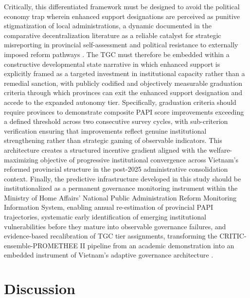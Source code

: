 \documentclass[12pt,a4paper]{article}
\begin{document}
Critically, this differentiated framework must be designed to avoid the political economy trap wherein enhanced support designations are perceived as punitive stigmatization of local administrations, a dynamic documented in the comparative decentralization literature as a reliable catalyst for strategic misreporting in provincial self-assessment and political resistance to externally imposed reform pathways \citep{Malesky2011, Malesky2010}. The TGC must therefore be embedded within a constructive developmental state narrative in which enhanced support is explicitly framed as a targeted investment in institutional capacity rather than a remedial sanction, with publicly codified and objectively measurable graduation criteria through which provinces can exit the enhanced support designation and accede to the expanded autonomy tier. Specifically, graduation criteria should require provinces to demonstrate composite PAPI score improvements exceeding a defined threshold across two consecutive survey cycles, with sub-criterion verification ensuring that improvements reflect genuine institutional strengthening rather than strategic gaming of observable indicators. This architecture creates a structured incentive gradient aligned with the welfare-maximizing objective of progressive institutional convergence across Vietnam's reformed provincial structure in the post-2025 administrative consolidation context. Finally, the predictive infrastructure developed in this study should be institutionalized as a permanent governance monitoring instrument within the Ministry of Home Affairs' National Public Administration Reform Monitoring Information System, enabling annual re-estimation of provincial PAPI trajectories, systematic early identification of emerging institutional vulnerabilities before they mature into observable governance failures, and evidence-based recalibration of TGC tier assignments, transforming the CRITIC-ensemble-PROMETHEE II pipeline from an academic demonstration into an embedded instrument of Vietnam's adaptive governance architecture \citep{Athey2017}.

\section{Discussion}
\label{sec:discussion}
\end{document}
